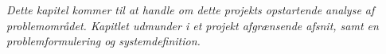 \textit{Dette kapitel kommer til at handle om dette projekts opstartende analyse af problemområdet. Kapitlet udmunder i et projekt afgrænsende afsnit, samt en problemformulering og systemdefinition.}